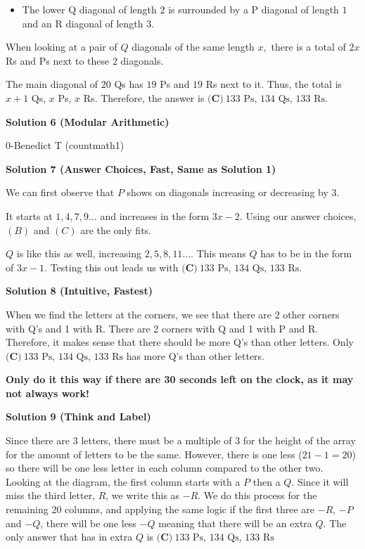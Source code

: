 \begin{enumerate}
            \begin{itemize}
        \item The lower $\text{Q}$ diagonal of length $2$ is surrounded by a $\text{P}$ diagonal of length $1$ and an $\text{R}$ diagonal of length $3.$
            \end{itemize}
            When looking at a pair of $Q$ diagonals of the same length $x,$ there is a total of $2x$ $\text{R}$s and $\text{P}$s next to these $2$ diagonals.

 The main diagonal of $20$ $\text{Q}$s has $19$ $\text{P}$s and $19$ $\text{R}$s next to it.  Thus, the total is $x+1$ $\text{Q}$s, $x$ $\text{P}$s, $x$ $\text{R}$s. Therefore, the answer is $\boxed{\textbf{(C)}~133\text{ Ps, }134\text{ Qs, }133\text{ Rs}}.$




\textbf{Solution 6 (Modular Arithmetic)}

0-Benedict T (countmath1)

 



\textbf{Solution 7 (Answer Choices, Fast, Same as Solution 1)}

We can first observe that $P$ shows on diagonals increasing or decreasing by $3.$ 

 It starts at $1,4,7,9...$ and increases in the form $3x-2$. Using our answer choices, $(B)$ and $(C)$ are the only fits.

 $Q$ is like this as well, increasing $2,5,8,11....$ This means $Q$ has to be in the form of $3x-1.$ Testing this out leads us with $\boxed{\textbf{(C)}~133\text{ Ps, }134\text{ Qs, }133\text{ Rs}}.$




\textbf{Solution 8 (Intuitive, Fastest)}

When we find the letters at the corners, we see that there are 2 other corners with Q's and 1 with R. There are 2 corners with Q and 1 with P and R. Therefore, it makes sense that there should be more Q's than other letters. Only $\boxed{\textbf{(C)}~133\text{ Ps, }134\text{ Qs, }133\text{ Rs}}$ has more Q's than other letters.

 \textbf{Only do it this way if there are 30 seconds left on the clock, as it may not always work!}

 



\textbf{Solution 9 (Think and Label)}

Since there are $3$ letters, there must be a multiple of 3 for the height of the array for the amount of letters to be the same. However, there is one less ($21-1=20$) so there will be one less letter in each column compared to the other two. Looking at the diagram, the first column starts with a $P$ then a $Q$. Since it will miss the third letter, $R$, we write this as $-R$. We do this process for the remaining 20 columns, and applying the same logic if the first three are $-R$, $-P$ and $-Q$, there will be one less $-Q$ meaning that there will be an extra $Q$. The only answer that has in extra $Q$ is $\textbf{(C)}~133\text{ Ps, }134\text{ Qs, }133\text{ Rs}$





\end{enumerate}
